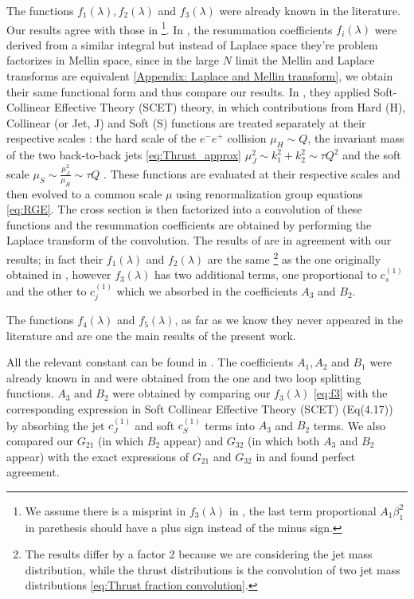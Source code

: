 \documentclass[../main.tex]{subfiles}
\begin{document}
The functions $f_1(\lambda),f_2(\lambda)$ and $f_3(\lambda)$ were already known in the literature. Our results agree with those in \cite{CATANI19933,Aglietti:2005mb,Monni:2011gb} 
\footnote{We assume there is a misprint in $f_3(\lambda)$ in \cite{Monni:2011gb}, the last term proportional $A_1 \beta_1^2$ in parethesis should have a plus sign instead of
the minus sign.}.
In \cite{Aglietti:2005mb}, the resummation coefficients $f_i(\lambda)$ were derived from a similar integral but instead of Laplace space they're problem factorizes in
Mellin space, since in the large $N$ limit the Mellin and Laplace transforms are equivalent \cref{Appendix: Laplace and Mellin transform}, we obtain their same functional
form and thus compare our results.
In \cite{Monni:2011gb}, they applied Soft-Collinear Effective Theory (SCET) theory, in which contributions from Hard (H), Collinear (or Jet, J) and Soft (S) functions are treated separately
at their respective scales \cite{Becher_2008}: the hard scale of the $e^-e^+$  collision $ \mu_H \sim Q$, the invariant mass of the two back-to-back jets \cref{eq:Thrust_approx} $\mu_J^2 \sim k_1^2+k_2^2 \sim \tau Q^2$  and 
the soft scale $\mu_S \sim \frac{\mu_J^2}{\mu_H}\sim \tau Q$ . These functions are evaluated at their respective scales and then evolved to a common scale $\mu$ using renormalization group equations \cref{eq:RGE}.
The cross section is then factorized into a convolution of these functions and the resummation coefficients are obtained by performing the Laplace transform of the convolution.
The results of \cite{Monni:2011gb} are in agreement with our results; in fact their $f_1(\lambda)$ and $f_2(\lambda)$ are the same \footnote{The results differ by a factor 2 because we are considering the jet mass distribution, while the thrust distributions
is the convolution of two jet mass distributions \cref{eq:Thrust fraction convolution}.}
as the one originally obtained in \cite{CATANI19933}, however $f_3(\lambda)$ has two additional terms, one proportional to $c_s^{(1)}$ and the other to $c_j^{(1)}$ which we absorbed in the coefficients $A_3$ and $B_2$.

The functions $f_4(\lambda)$ and $f_5(\lambda)$, as far as we know they never appeared in the literature and are one the main results of the present work.

All the relevant constant can be found in .
The coefficients $A_1,A_2$ and $B_1$ were already known in \cite{CATANI19933} and were obtained from the one and two loop splitting functions.
$A_3$ and $B_2$ were obtained by comparing our $f_3(\lambda)$ \cref{eq:f3} with the corresponding expression in Soft Collinear Effective Theory (SCET) \cite{Monni:2011gb} (Eq(4.17)) by 
absorbing the jet $c_J^{(1)}$ and soft $c_S^{(1)}$ terms into $A_3$ and $B_2$ terms.
We also compared our $G_{21}$ (in which $B_2$ appear) and $G_{32}$ (in which both $A_3$ and $B_2$ appear) with the exact expressions of 
$G_{21}$ and $G_{32}$ in \cite{Becher_2008} and found perfect agreement.
\end{document}
